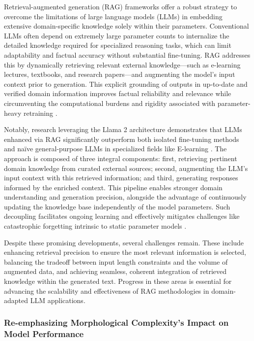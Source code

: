 \documentclass[sigconf]{acmart}
\begin{document}
Retrieval-augmented generation (RAG) frameworks offer a robust strategy to overcome the limitations of large language models (LLMs) in embedding extensive domain-specific knowledge solely within their parameters. Conventional LLMs often depend on extremely large parameter counts to internalize the detailed knowledge required for specialized reasoning tasks, which can limit adaptability and factual accuracy without substantial fine-tuning. RAG addresses this by dynamically retrieving relevant external knowledge—such as e-learning lectures, textbooks, and research papers—and augmenting the model’s input context prior to generation. This explicit grounding of outputs in up-to-date and verified domain information improves factual reliability and relevance while circumventing the computational burdens and rigidity associated with parameter-heavy retraining \cite{ref8}.

Notably, research leveraging the Llama 2 architecture demonstrates that LLMs enhanced via RAG significantly outperform both isolated fine-tuning methods and naïve general-purpose LLMs in specialized fields like E-learning \cite{ref49}. The approach is composed of three integral components: first, retrieving pertinent domain knowledge from curated external sources; second, augmenting the LLM’s input context with this retrieved information; and third, generating responses informed by the enriched context. This pipeline enables stronger domain understanding and generation precision, alongside the advantage of continuously updating the knowledge base independently of the model parameters. Such decoupling facilitates ongoing learning and effectively mitigates challenges like catastrophic forgetting intrinsic to static parameter models \cite{ref49}.

Despite these promising developments, several challenges remain. These include enhancing retrieval precision to ensure the most relevant information is selected, balancing the tradeoff between input length constraints and the volume of augmented data, and achieving seamless, coherent integration of retrieved knowledge within the generated text. Progress in these areas is essential for advancing the scalability and effectiveness of RAG methodologies in domain-adapted LLM applications.

\subsubsection{Re-emphasizing Morphological Complexity’s Impact on Model Performance}
\end{document}
